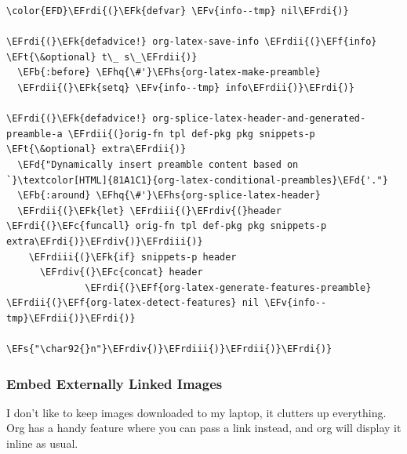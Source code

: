 \documentclass{scrartcl}
\newcommand{\EFk}[1]{\textcolor{EFk}{#1}} %
\newcommand{\EFd}[1]{\textcolor{EFd}{#1}} %
\newcommand{\EFt}[1]{\textcolor{EFt}{#1}} %
\newcommand{\EFs}[1]{\textcolor{EFs}{#1}} %
\newcommand{\EFb}[1]{\textcolor{EFb}{#1}} %
\newcommand{\EFc}[1]{\textcolor{EFc}{#1}} %
\newcommand{\EFv}[1]{\textcolor{EFv}{#1}} %
\newcommand{\EFf}[1]{\textcolor{EFf}{#1}} %
\newcommand{\EFhq}[1]{#1} %
\newcommand{\EFhs}[1]{#1} %
\newcommand{\EFrdi}[1]{#1} %
\newcommand{\EFrdii}[1]{#1} %
\newcommand{\EFrdiii}[1]{#1} %
\newcommand{\EFrdiv}[1]{#1} %
\begin{document}
\begin{Code}
\begin{Verbatim}[]
\color{EFD}\EFrdi{(}\EFk{defvar} \EFv{info--tmp} nil\EFrdi{)}

\EFrdi{(}\EFk{defadvice!} org-latex-save-info \EFrdii{(}\EFf{info} \EFt{\&optional} t\_ s\_\EFrdii{)}
  \EFb{:before} \EFhq{\#'}\EFhs{org-latex-make-preamble}
  \EFrdii{(}\EFk{setq} \EFv{info--tmp} info\EFrdii{)}\EFrdi{)}

\EFrdi{(}\EFk{defadvice!} org-splice-latex-header-and-generated-preamble-a \EFrdii{(}orig-fn tpl def-pkg pkg snippets-p \EFt{\&optional} extra\EFrdii{)}
  \EFd{"Dynamically insert preamble content based on `}\textcolor[HTML]{81A1C1}{org-latex-conditional-preambles}\EFd{'."}
  \EFb{:around} \EFhq{\#'}\EFhs{org-splice-latex-header}
  \EFrdii{(}\EFk{let} \EFrdiii{(}\EFrdiv{(}header \EFrdi{(}\EFc{funcall} orig-fn tpl def-pkg pkg snippets-p extra\EFrdi{)}\EFrdiv{)}\EFrdiii{)}
    \EFrdiii{(}\EFk{if} snippets-p header
      \EFrdiv{(}\EFc{concat} header
              \EFrdi{(}\EFf{org-latex-generate-features-preamble} \EFrdii{(}\EFf{org-latex-detect-features} nil \EFv{info--tmp}\EFrdii{)}\EFrdi{)}
              \EFs{"\char92{}n"}\EFrdiv{)}\EFrdiii{)}\EFrdii{)}\EFrdi{)}
\end{Verbatim}
\end{Code}

\subsubsection{Embed Externally Linked Images}
\label{sec:org99b83cf}
I don't like to keep images downloaded to my laptop, it clutters up everything.
Org has a handy feature where you can pass a link instead, and org will display
it inline as usual.
\end{document}
